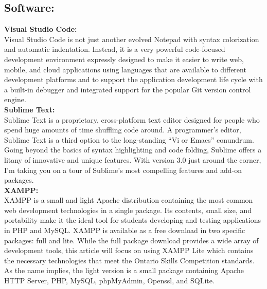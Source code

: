 \subsection{Software:}
\indent \textbf{Visual Studio Code:\\}
 Visual Studio Code is not just another evolved Notepad with syntax colorization and automatic indentation. Instead, it is a very powerful code-focused development
 environment expressly designed to make it easier to write web, mobile, and cloud applications using languages that are available to different development platforms and
  to support the application development life cycle with a built-in debugger and integrated support for the popular Git version control engine.\cite{Del_Sole2021-cv}\\

\textbf{Sublime Text:\\}
 Sublime Text is a proprietary, cross-platform text editor designed for people who spend huge amounts of time shuffling code around. A programmer's editor,
 Sublime Text is a third option to the long-standing “Vi or Emacs” conundrum. Going beyond the basics of syntax highlighting and code folding, Sublime offers a 
 litany of innovative and unique features. With version 3.0 just around the corner, I'm taking you on a tour of Sublime's most compelling features and add-on packages.\cite{kinder2013sublime}\\


 \textbf{XAMPP:\\}
 \indent XAMPP is a small and light Apache distribution containing the most common web development
 technologies in a single package. Its contents, small size, and portability make it the ideal tool for
 students developing and testing applications in PHP and MySQL. XAMPP is available as a free
 download in two specific packages: full and lite. While the full package download provides a wide
 array of development tools, this article will focus on using XAMPP Lite which contains the necessary
 technologies that meet the Ontario Skills Competition standards. As the name implies, the light version
 is a small package containing Apache HTTP Server, PHP, MySQL, phpMyAdmin, Openssl, and
 SQLite.\cite{dvorski2007installing}\\



